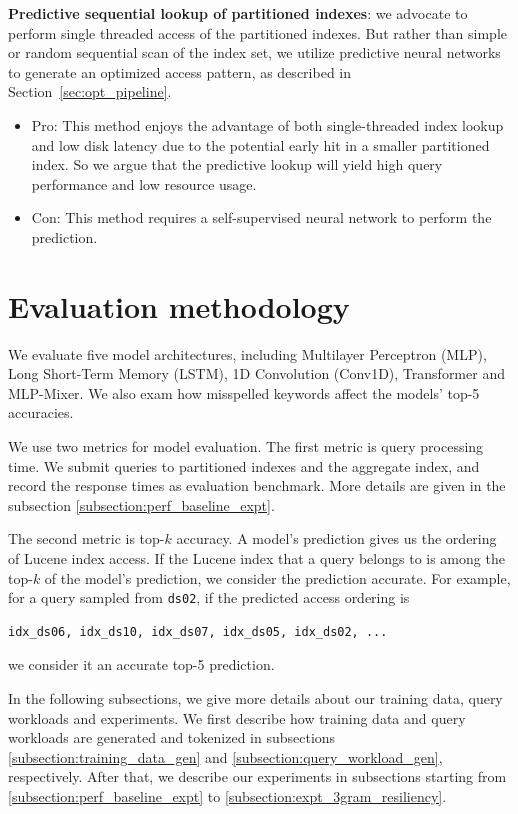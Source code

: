 {\noindent \bf Predictive sequential lookup of partitioned indexes}: we advocate to perform single threaded  access of the partitioned indexes.  But rather than simple or random sequential scan of the index set, we utilize predictive neural networks to generate an optimized access pattern, as described in Section~\ref{sec:opt_pipeline}.

\begin{itemize}
    \item Pro: This method enjoys the advantage of both single-threaded index lookup and  low disk latency due to the potential early hit in a smaller partitioned index.  So we argue that the predictive lookup will yield high query performance and low resource usage.
    \item Con: This method requires a self-supervised neural network to perform the prediction.
\end{itemize}

\section{Evaluation methodology}
We evaluate five model architectures, including Multilayer Perceptron (MLP), Long Short-Term Memory (LSTM), 1D Convolution (Conv1D), Transformer and MLP-Mixer. We also exam how misspelled keywords affect the models' top-5 accuracies.

We use two metrics for model evaluation. The first metric is query processing time. We submit queries to partitioned indexes and the aggregate index, and record the response times as evaluation benchmark. More details are given in the subsection \ref{subsection:perf_baseline_expt}.

The second metric is top-$k$ accuracy. A model's prediction gives us the ordering of Lucene index access. If the Lucene index that a query belongs to is among the top-$k$ of the model's prediction, we consider the prediction accurate. For example, for a query sampled from \verb|ds02|, if the predicted access ordering is 
\begin{verbatim}
idx_ds06, idx_ds10, idx_ds07, idx_ds05, idx_ds02, ...
\end{verbatim}
we consider it an accurate top-5 prediction.

In the following subsections, we give more details about our training data, query workloads and experiments. We first describe how training data and query workloads are generated and tokenized in subsections \ref{subsection:training_data_gen} and \ref{subsection:query_workload_gen}, respectively. 
After that, we describe our experiments in subsections starting from  \ref{subsection:perf_baseline_expt} to  \ref{subsection:expt_3gram_resiliency}.

